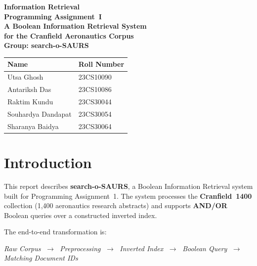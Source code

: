 \documentclass[12pt,a4paper]{article}
\begin{document}
\begin{titlepage}
\centering
\vspace*{2cm}
{\LARGE\bfseries Information Retrieval}\\[0.4cm]
{\Large\bfseries Programming Assignment~I}\\[2cm]
{\huge\bfseries A Boolean Information Retrieval System\\for the Cranfield Aeronautics Corpus}\\[2cm]
{\Large\bfseries Group: search-o-SAURS}\\[1.5cm]
\begin{tabular}{l l}
\toprule
\textbf{Name} & \textbf{Roll Number} \\
\midrule
Utsa Ghosh & 23CS10090 \\
Antariksh Das & 23CS10086 \\
Raktim Kundu & 23CS30044 \\
Souhardya Dandapat & 23CS30054 \\
Sharanya Baidya & 23CS30064 \\
\bottomrule
\end{tabular}
\vfill
\end{titlepage}

\tableofcontents
\newpage

\section{Introduction}
\label{sec:introduction}

This report describes \textbf{search-o-SAURS}, a Boolean Information Retrieval
system built for Programming Assignment~1.  The system processes the
\textbf{Cranfield~1400} collection (1,400 aeronautics research abstracts) and
supports \textbf{AND/OR} Boolean queries over a constructed inverted index.

The end-to-end transformation is:
\begin{center}
\textit{Raw Corpus}
$\;\to\;$ \textit{Preprocessing}
$\;\to\;$ \textit{Inverted Index}
$\;\to\;$ \textit{Boolean Query}
$\;\to\;$ \textit{Matching Document IDs}
\end{center}
\end{document}
